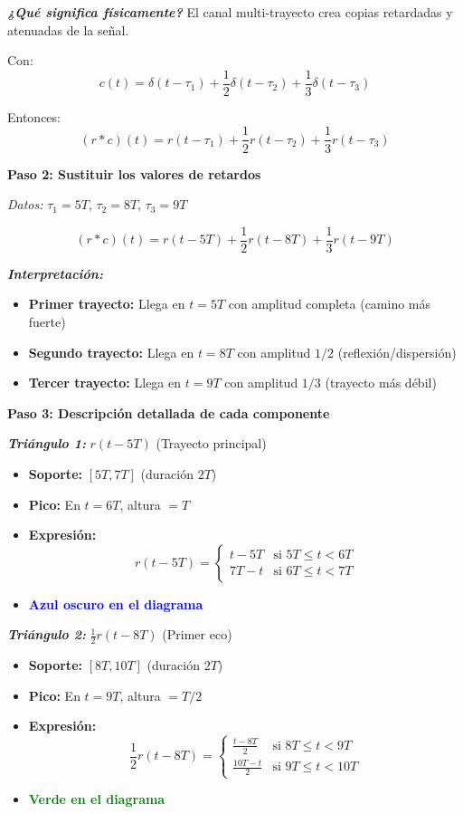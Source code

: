 \documentclass[11pt,a4paper]{article}
\begin{document}
\textit{\textbf{¿Qu\'e significa f\'isicamente?}} El canal multi-trayecto crea copias retardadas y atenuadas de la se\~nal.

Con:
\[
c(t) = \delta(t-\tau_1) + \frac{1}{2}\delta(t-\tau_2) + \frac{1}{3}\delta(t-\tau_3)
\]

Entonces:
\[
(r * c)(t) = r(t-\tau_1) + \frac{1}{2}r(t-\tau_2) + \frac{1}{3}r(t-\tau_3)
\]

\textbf{Paso 2: Sustituir los valores de retardos}

\textit{Datos:} $\tau_1 = 5T$, $\tau_2 = 8T$, $\tau_3 = 9T$

\[
(r * c)(t) = r(t-5T) + \frac{1}{2}r(t-8T) + \frac{1}{3}r(t-9T)
\]

\textit{\textbf{Interpretaci\'on:}}
\begin{itemize}
    \item \textbf{Primer trayecto:} Llega en $t = 5T$ con amplitud completa (camino m\'as fuerte)
    \item \textbf{Segundo trayecto:} Llega en $t = 8T$ con amplitud $1/2$ (reflexi\'on/dispersi\'on)
    \item \textbf{Tercer trayecto:} Llega en $t = 9T$ con amplitud $1/3$ (trayecto m\'as d\'ebil)
\end{itemize}

\textbf{Paso 3: Descripci\'on detallada de cada componente}

\textit{\textbf{Tri\'angulo 1:}} $r(t-5T)$ (Trayecto principal)
\begin{itemize}
    \item \textbf{Soporte:} $[5T, 7T]$ (duraci\'on $2T$)
    \item \textbf{Pico:} En $t = 6T$, altura $= T$
    \item \textbf{Expresi\'on:} 
    \[
    r(t-5T) = \begin{cases}
    t - 5T & \text{si } 5T \leq t < 6T \\
    7T - t & \text{si } 6T \leq t < 7T
    \end{cases}
    \]
    \item \textcolor{blue}{\textbf{Azul oscuro en el diagrama}}
\end{itemize}

\textit{\textbf{Tri\'angulo 2:}} $\frac{1}{2}r(t-8T)$ (Primer eco)
\begin{itemize}
    \item \textbf{Soporte:} $[8T, 10T]$ (duraci\'on $2T$)
    \item \textbf{Pico:} En $t = 9T$, altura $= T/2$
    \item \textbf{Expresi\'on:}
    \[
    \frac{1}{2}r(t-8T) = \begin{cases}
    \frac{t - 8T}{2} & \text{si } 8T \leq t < 9T \\
    \frac{10T - t}{2} & \text{si } 9T \leq t < 10T
    \end{cases}
    \]
    \item \textcolor{green}{\textbf{Verde en el diagrama}}
\end{itemize}
\end{document}
